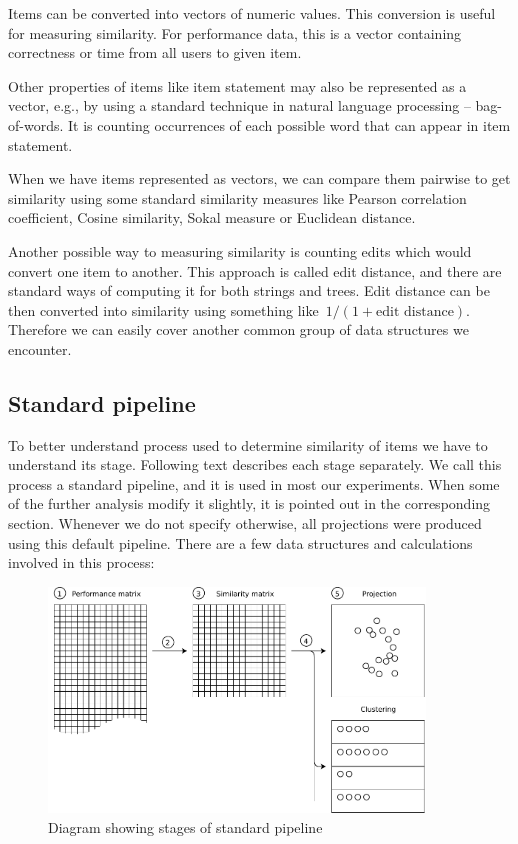 \documentclass[
  printed, %
  table,   %
  nolof,     %
  nolot,     %
  color,
  final,
  nocover
]{fithesis3}
\begin{document}

Items can be converted into vectors of numeric values. This conversion is useful for measuring similarity. For performance data, this is a vector containing correctness or time from all users to given item.

Other properties of items like item statement may also be represented as a vector, e.g., by using a standard technique in natural language processing -- bag-of-words. It is counting occurrences of each possible word that can appear in item statement.

When we have items represented as vectors, we can compare them pairwise to get similarity using some standard similarity measures like Pearson correlation coefficient, Cosine similarity, Sokal measure or Euclidean distance.


Another possible way to measuring similarity is counting edits which would convert one item to another. This approach is called edit distance, and there are standard ways of computing it for both strings and trees. Edit distance can be then converted into similarity using something like~$1 / (1 + \text{edit distance})$. Therefore we can easily cover another common group of data structures we encounter.


\subsection{Standard pipeline}\label{standard-pipeline}


To better understand process used to determine similarity of items we have to understand its stage. Following text describes each stage separately. We call this process a standard pipeline, and it is used in most our experiments. When some of the further analysis modify it slightly, it is pointed out in the corresponding section. Whenever we do not specify otherwise, all projections were produced using this default pipeline. There are a few data structures and calculations involved in this process:

\begin{figure}
  \includegraphics[width=10cm]{img/pipeline_diagram}
  \caption{Diagram showing stages of standard pipeline}
  \label{fig:pipeline_diagram}
\end{figure}
\end{document}
